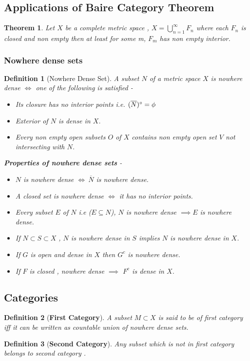\documentclass{article}
\newtheorem{theorem}{Theorem}[section]
\newtheorem{defn}{Definition}[section]
\begin{document}
	\subsection{\Large{Applications of Baire Category Theorem}}
	\begin{theorem}
		Let $X$ be a complete metric space , $X=\bigcup_{n=1}^{\infty}F_n$ where each $F_{n}$ is closed  and non empty then  at least for some m, $F_{m}$ has non empty interior.
	\end{theorem}
\subsubsection{\Large Nowhere dense sets}
	\begin{defn}[Nowhere Dense Set]
	A subset $N$  of a metric space $X$ is nowhere dense $\iff$ one of the following is satisfied - 
	\begin{itemize}
		\item Its closure has no interior points i.e. $(\overline{N})\degree = \phi$
		
		\item Exterior of $N$ is dense in $X$.
		\item  Every non empty open subsets $O$ of $X$ contains non empty open set $V$ not intersecting with $N$.
	\end{itemize}
	\textbf{Properties of nowhere dense sets} -
	\begin{itemize}
		\item $N$ is nowhere dense $\iff \  \overline{N}$ is nowhere dense.
		\item A closed set is nowhere dense $\iff$ it has no interior points.
		\item  Every subset $ E$ of $N$ i.e ($E\subseteq N$), $N$ is nowhere dense $\implies E $ is nowhere dense.
		\item  If $N\subset S\subset X$ , $N $ is nowhere dense in $S$ implies $N$ is nowhere dense in $X$.
		\item If $G$ is open and dense in $X$ then $G^c $ is nowhere dense.
		\item  If $F$ is closed , nowhere dense $\implies$ $F^c$ is dense in $X$.
		
	\end{itemize}
	\end{defn}
\subsection{\Large Categories }
\begin{defn}[\textbf{First Category}]
	A subset $M\subset X$ is said to be of first category iff it can be written as countable union of nowhere dense  sets.
	
\end{defn}
\begin{defn}[\textbf{Second Category}]
	Any subset which is not in first category belongs to second category .
\end{defn}
\end{document}

